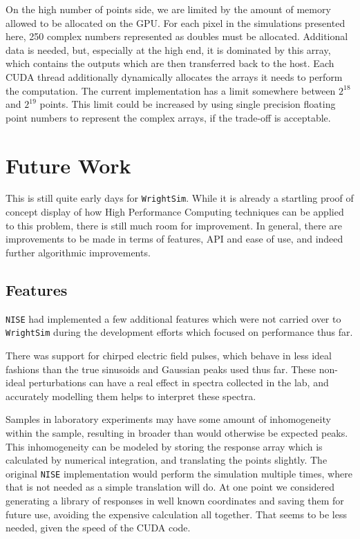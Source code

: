 \documentclass[fontsize=11pt]{scrartcl}
\numberwithin{equation}{section}		%
\numberwithin{figure}{section}			%
\numberwithin{table}{section}				%
\begin{document}
On the high number of points side, we are limited by the amount of memory allowed to be allocated on the GPU.
For each pixel in the simulations presented here, 250 complex numbers represented as doubles must be allocated.
Additional data is needed, but, especially at the high end, it is dominated by this array, which contains the outputs which are then transferred back to the host.
Each CUDA thread additionally dynamically allocates the arrays it needs to perform the computation.
The current implementation has a limit somewhere between $2^{18}$ and $2^{19}$ points.
This limit could be increased by using single precision floating point numbers to represent the complex arrays, if the trade-off is acceptable.

\section{Future Work}

This is still quite early days for \texttt{WrightSim}.
While it is already a startling proof of concept display of how High Performance Computing techniques can be applied to this problem, there is still much room for improvement.
In general, there are improvements to be made in terms of features, API and ease of use, and indeed further algorithmic improvements.

\subsection{Features}

\texttt{NISE} had implemented a few additional features which were not carried over to \texttt{WrightSim} during the development efforts which focused on performance thus far.

There was support for chirped electric field pulses, which behave in less ideal fashions than the true sinusoids and Gaussian peaks used thus far.
These non-ideal perturbations can have a real effect in spectra collected in the lab, and accurately modelling them helps to interpret these spectra.

Samples in laboratory experiments may have some amount of inhomogeneity within the sample, resulting in broader than would otherwise be expected peaks.
This inhomogeneity can be modeled by storing the response array which is calculated by numerical integration, and translating the points slightly.
The original \texttt{NISE} implementation would perform the simulation multiple times, where that is not needed as a simple translation will do.
At one point we considered generating a library of responses in well known coordinates and saving them for future use, avoiding the expensive calculation all together.
That seems to be less needed, given the speed of the CUDA code.
\end{document}
